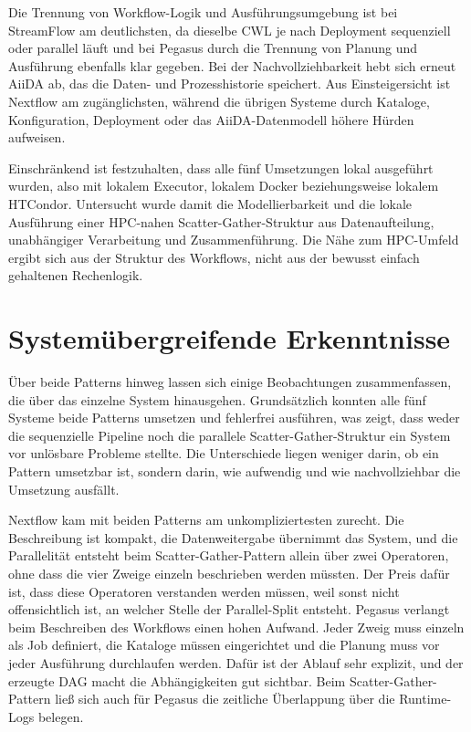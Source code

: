 Die Trennung von Workflow-Logik und Ausführungsumgebung ist bei StreamFlow am deutlichsten, da
dieselbe CWL je nach Deployment sequenziell oder parallel läuft und bei Pegasus durch die Trennung
von Planung und Ausführung ebenfalls klar gegeben. Bei der Nachvollziehbarkeit hebt sich erneut
AiiDA ab, das die Daten- und Prozesshistorie speichert. Aus Einsteigersicht ist Nextflow am
zugänglichsten, während die übrigen Systeme durch
Kataloge, Konfiguration, Deployment oder das AiiDA-Datenmodell höhere Hürden aufweisen.

Einschränkend ist festzuhalten, dass alle fünf Umsetzungen lokal ausgeführt wurden, also mit
lokalem Executor, lokalem Docker beziehungsweise lokalem HTCondor. Untersucht wurde damit die
Modellierbarkeit und die lokale Ausführung einer HPC-nahen Scatter-Gather-Struktur aus
Datenaufteilung, unabhängiger Verarbeitung und Zusammenführung. Die Nähe zum HPC-Umfeld ergibt sich aus der Struktur des Workflows, nicht aus
der bewusst einfach gehaltenen Rechenlogik.

\section{Systemübergreifende Erkenntnisse}
\label{sec:practical:overall}

Über beide Patterns hinweg lassen sich einige Beobachtungen zusammenfassen, die über das einzelne
System hinausgehen. Grundsätzlich konnten alle fünf Systeme beide Patterns umsetzen und
fehlerfrei ausführen, was zeigt, dass weder die sequenzielle Pipeline noch die parallele
Scatter-Gather-Struktur ein System vor unlösbare Probleme stellte. Die Unterschiede liegen weniger
darin, ob ein Pattern umsetzbar ist, sondern darin, wie aufwendig und wie nachvollziehbar die Umsetzung
ausfällt.

Nextflow kam mit beiden Patterns am unkompliziertesten zurecht. Die Beschreibung ist kompakt, die
Datenweitergabe übernimmt das System, und die Parallelität entsteht beim Scatter-Gather-Pattern
allein über zwei Operatoren, ohne dass die vier Zweige einzeln beschrieben werden müssten. Der
Preis dafür ist, dass diese Operatoren verstanden werden müssen, weil sonst nicht offensichtlich
ist, an welcher Stelle der Parallel-Split entsteht. Pegasus verlangt beim Beschreiben des Workflows
einen hohen Aufwand. Jeder Zweig muss einzeln als Job definiert, die Kataloge müssen eingerichtet und die Planung muss vor jeder Ausführung durchlaufen werden. Dafür ist der Ablauf sehr explizit, und der erzeugte DAG macht die Abhängigkeiten gut sichtbar. Beim
Scatter-Gather-Pattern ließ sich auch für Pegasus die zeitliche Überlappung über die Runtime-Logs
belegen.
 

